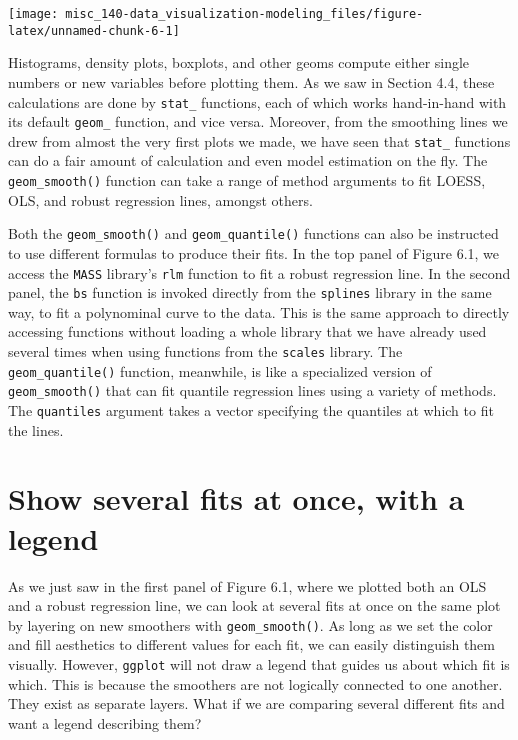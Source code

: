 \documentclass[]{book}
\begin{document}
\begin{center}\texttt{[image: misc\_140-data\_visualization-modeling\_files/figure-latex/unnamed-chunk-6-1]} \end{center}

Histograms, density plots, boxplots, and other geoms compute either single numbers or new variables before plotting them. As we saw in Section 4.4, these calculations are done by \texttt{stat\_} functions, each of which works hand-in-hand with its default \texttt{geom\_} function, and vice versa. Moreover, from the smoothing lines we drew from almost the very first plots we made, we have seen that \texttt{stat\_} functions can do a fair amount of calculation and even model estimation on the fly. The \texttt{geom\_smooth()} function can take a range of method arguments to fit LOESS, OLS, and robust regression lines, amongst others.

Both the \texttt{geom\_smooth()} and \texttt{geom\_quantile()} functions can also be instructed to use different formulas to produce their fits. In the top panel of Figure 6.1, we access the \texttt{MASS} library's \texttt{rlm} function to fit a robust regression line. In the second panel, the \texttt{bs} function is invoked directly from the \texttt{splines} library in the same way, to fit a polynominal curve to the data. This is the same approach to directly accessing functions without loading a whole library that we have already used several times when using functions from the \texttt{scales} library. The \texttt{geom\_quantile()} function, meanwhile, is like a specialized version of \texttt{geom\_smooth()} that can fit quantile regression lines using a variety of methods. The \texttt{quantiles} argument takes a vector specifying the quantiles at which to fit the lines.

\hypertarget{show-several-fits-at-once-with-a-legend}{%
\section{Show several fits at once, with a legend}\label{show-several-fits-at-once-with-a-legend}}

As we just saw in the first panel of Figure 6.1, where we plotted both an OLS and a robust regression line, we can look at several fits at once on the same plot by layering on new smoothers with \texttt{geom\_smooth()}. As long as we set the color and fill aesthetics to different values for each fit, we can easily distinguish them visually. However, \texttt{ggplot} will not draw a legend that guides us about which fit is which. This is because the smoothers are not logically connected to one another. They exist as separate layers. What if we are comparing several different fits and want a legend describing them?
\end{document}
